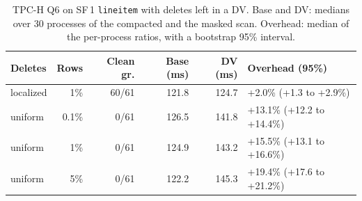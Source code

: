 \begin{table}[t]
\centering
\footnotesize
\caption{TPC-H Q6 on SF\,1 \texttt{lineitem} with deletes left in a DV. Base and DV: medians over 30 processes of the compacted and the masked scan. Overhead: median of the per-process ratios, with a bootstrap 95\% interval.}
\label{tab:scan}
\setlength{\tabcolsep}{3pt}
\begin{tabular}{@{}l r r r r l@{}}
\toprule
Deletes & Rows & Clean gr. & Base (ms) & DV (ms) & Overhead (95\%) \\
\midrule
localized & 1\% & 60/61 & 121.8 & 124.7 & +2.0\% (+1.3 to +2.9\%) \\
uniform & 0.1\% & 0/61 & 126.5 & 141.8 & +13.1\% (+12.2 to +14.4\%) \\
uniform & 1\% & 0/61 & 124.9 & 143.2 & +15.5\% (+13.1 to +16.6\%) \\
uniform & 5\% & 0/61 & 122.2 & 145.3 & +19.4\% (+17.6 to +21.2\%) \\
\bottomrule
\end{tabular}
\end{table}
